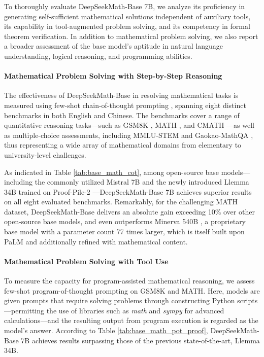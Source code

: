 To thoroughly evaluate DeepSeekMath-Base 7B, we analyze its proficiency in generating self-sufficient mathematical solutions independent of auxiliary tools, its capability in tool-augmented problem solving, and its competency in formal theorem verification. In addition to mathematical problem solving, we also report a broader assessment of the base model’s aptitude in natural language understanding, logical reasoning, and programming abilities.

\paragraph{Mathematical Problem Solving with Step-by-Step Reasoning}

The effectiveness of DeepSeekMath-Base in resolving mathematical tasks is measured using few-shot chain-of-thought prompting \citep{cot}, spanning eight distinct benchmarks in both English and Chinese. The benchmarks cover a range of quantitative reasoning tasks—such as GSM8K \citep{gsm8k}, MATH \citep{MATH}, and CMATH \citep{wei2023cmath}—as well as multiple-choice assessments, including MMLU-STEM \citep{mmlu} and Gaokao-MathQA \citep{agieval}, thus representing a wide array of mathematical domains from elementary to university-level challenges.

As indicated in Table \ref{tab:base_math_cot}, among open-source base models—including the commonly utilized Mistral 7B \citep{mistral} and the newly introduced Llemma 34B \citep{llemma} trained on Proof-Pile-2 \citep{llemma}—DeepSeekMath-Base 7B achieves superior results on all eight evaluated benchmarks. Remarkably, for the challenging MATH dataset, DeepSeekMath-Base delivers an absolute gain exceeding 10\% over other open-source base models, and even outperforms Minerva 540B \citep{minerva}, a proprietary base model with a parameter count 77 times larger, which is itself built upon PaLM \citep{palm} and additionally refined with mathematical content.

\paragraph{Mathematical Problem Solving with Tool Use} To measure the capacity for program-assisted mathematical reasoning, we assess few-shot program-of-thought prompting \citep{pot,pal} on GSM8K and MATH. Here, models are given prompts that require solving problems through constructing Python scripts—permitting the use of libraries such as \textit{math} and \textit{sympy} for advanced calculations—and the resulting output from program execution is regarded as the model's answer. According to Table \ref{tab:base_math_pot_proof}, DeepSeekMath-Base 7B achieves results surpassing those of the previous state-of-the-art, Llemma 34B.

